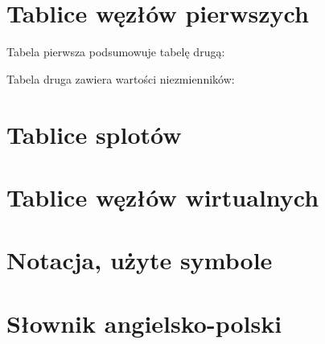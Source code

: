\documentclass{LegrandOrangeBook}
\begin{document}
\begin{appendices}
    \renewcommand{\chaptername}{Appendix} %
    \chapter{Tablice węzłów pierwszych}
    
    Tabela pierwsza podsumowuje tabelę drugą:
    
    \newpage
    Tabela druga zawiera wartości niezmienników:
    
    

    \chapter{Tablice splotów}
    

    \chapter{Tablice węzłów wirtualnych}
    

    \chapter{Notacja, użyte symbole}
    

    \chapter{Słownik angielsko-polski}
    \begin{compactitem}
    
    \end{compactitem}
\end{appendices}


\end{document}
